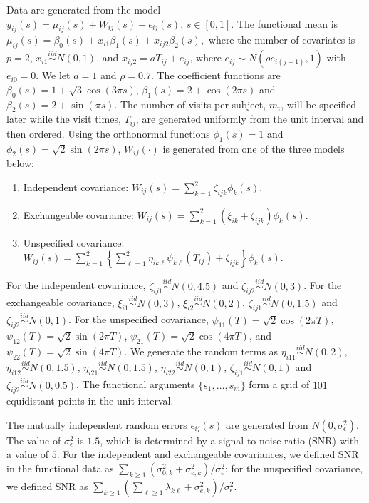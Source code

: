 \documentclass[submit]{smj}
\begin{document}
Data are generated from the model   $y_{ij}(s) = \mu_{ij}(s) + W_{ij}(s) + \epsilon_{ij}(s),\, s\in [0,1]$.  The functional mean is 
$\mu_{ij}(s)=\beta_0(s) + x_{i1}\beta_1(s)+x_{ij2}\beta_2(s),$ where the number of covariates is $p=2$, $x_{i1} \overset{iid}{\sim} N(0,1)$, and $x_{ij2}=aT_{ij}+ e_{ij}$, where $e_{ij}\sim N(\rho e_{i(j-1)}, 1)$ with $e_{i0} = 0$. We let $a = 1$ and $\rho = 0.7$.  The coefficient functions are  $\beta_0(s) = 1 + \sqrt{3}\cos(3\pi s)$, $\beta_1(s) = 2 + \cos(2\pi s)$ and   $\beta_2(s) = 2 + \sin(\pi s)$. The number of visits per subject, $m_i$, will be specified later while the visit times, $T_{ij}$, are generated uniformly from the unit interval and then ordered.   Using the orthonormal functions $\phi_1(s) = 1$ and $\phi_2(s) = \sqrt{2}\sin(2\pi s)$, $W_{ij}(\cdot)$ is generated from one of the three models below:
\begin{enumerate}
	\item Independent covariance: $W_{ij}(s) = \sum_{k=1}^2 \zeta_{ijk} \phi_k(s)$\;.
	\item Exchangeable covariance: $W_{ij}(s) = \sum_{k=1}^2 (\xi_{ik} + \zeta_{ijk}) \phi_k(s)$\;.
	\item Unspecified covariance: $W_{ij}(s) = \sum_{k=1}^2 \left\{
	\sum_{\ell=1}^2 \eta_{ik\ell} \psi_{k\ell}(T_{ij}) + \zeta_{ijk} \right\}\phi_k(s)$\;.
\end{enumerate}
For the independent covariance, $\zeta_{ij1} \overset{iid}{\sim}  N(0, 4.5)$
and $\zeta_{ij2} \overset{iid}{\sim} N(0, 3)$.
For the exchangeable covariance, $\xi_{i1} \overset{iid}{\sim}  N(0,3)$,
$\xi_{i2} \overset{iid}{\sim} N(0, 2)$, $\zeta_{ij1} \overset{iid}{\sim}  N(0,1.5)$
and $\zeta_{ij2} \overset{iid}{\sim}  N(0, 1)$. For the unspecified covariance, $\psi_{11}(T) = \sqrt{2}\cos(2\pi T)$, $\psi_{12}(T) = \sqrt{2}\sin(2\pi T)$, $\psi_{21}(T) = \sqrt{2}\cos(4\pi T)$, and  $\psi_{22}(T) = \sqrt{2}\sin(4\pi T)$. We generate the random terms as $ \eta_{i11}  \overset{iid}{\sim} N(0,2)$, $\eta_{i12}  \overset{iid}{\sim} N(0,1.5)$, $\eta_{i21}  \overset{iid}{\sim} N(0, 1.5)$, $\eta_{i22}  \overset{iid}{\sim} N(0,1)$, $\zeta_{ij1} \overset{iid}{\sim}  N(0, 1)$ and $\zeta_{ij2} \overset{iid}{\sim} N(0, 0.5)$. The functional arguments $\{s_1, \dots, s_m \}$ form a grid of $101$ equidistant points in the unit interval.


The mutually independent random errors $\epsilon_{ij}(s)$
are generated  from $N(0, \sigma_{\epsilon}^2)$. The value of $\sigma_{\epsilon}^2$ is $1.5$, which is determined by 
a signal to noise ratio (SNR) with a value of $5$. For the independent and exchangeable covariances, 
we defined SNR in the functional data as ${\sum_{k\geq 1}(\sigma^2_{0,k} +  \sigma^2_{e,k})}/{\sigma_{\epsilon}^2}$; for the unspecified covariance, we defined SNR as ${\sum_{k\geq 1} ( \sum_{\ell\geq 1} \lambda_{k\ell} +  \sigma^2_{e,k})}/{ \sigma_{\epsilon}^2}$.
\end{document}

